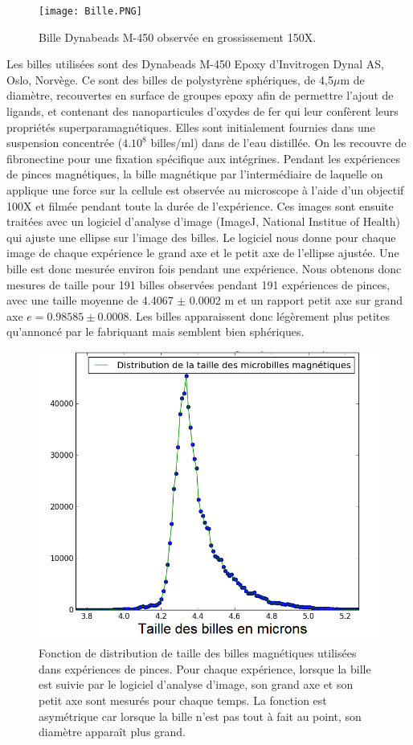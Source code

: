 		\begin{figure}
		\texttt{[image: Bille.PNG]}
		\caption{Bille Dynabeads M-450 observée en grossissement 150X.}
		\end{figure}
		Les billes utilisées sont des Dynabeads M-450 Epoxy d'Invitrogen Dynal AS, Oslo, Norvège. 
		Ce sont des billes de polystyrène sphériques, de 4,5$\mu$m de diamètre, recouvertes en surface de groupes epoxy afin de permettre l'ajout de ligands, et contenant des nanoparticules d'oxydes de fer qui leur confèrent leurs propriétés superparamagnétiques. 
		Elles sont initialement fournies dans une suspension concentrée ($4.10^8$ billes/ml) dans de l'eau distillée. On les recouvre de fibronectine pour une fixation spécifique aux intégrines.
		Pendant les expériences de pinces magnétiques, la bille magnétique par l'intermédiaire de laquelle on applique une force sur la cellule est observée au microscope à l'aide d'un objectif 100X et filmée pendant toute la durée de l'expérience.  Ces images sont ensuite traitées avec un logiciel d'analyse d'image (ImageJ, National Institue of Health) qui ajuste une ellipse sur l'image des billes. Le logiciel nous donne pour chaque image de chaque expérience le grand axe et le petit axe de l'ellipse ajustée. Une bille est donc mesurée environ  fois pendant une expérience.  
		Nous obtenons donc  mesures de taille pour 191 billes observées pendant 191 expériences de pinces, avec une taille moyenne de 4.4067 $\pm$ 0.0002 \micro m et un rapport petit axe sur grand axe $e=0.98585 \pm 0.0008$. Les billes apparaissent donc légèrement plus petites qu'annoncé par le fabriquant mais semblent bien sphériques.
		\begin{figure}
		\includegraphics[scale=0.3]{Taille_des_billes.png}
		\caption{Fonction de distribution de taille des billes magnétiques utilisées dans  expériences de pinces. Pour chaque expérience, lorsque la bille est suivie par le logiciel d'analyse d'image, son grand axe et son petit axe sont mesurés pour chaque temps. La fonction est asymétrique car lorsque la bille n'est pas tout à fait au point, son diamètre apparaît plus grand.}
\end{figure}		 
		
